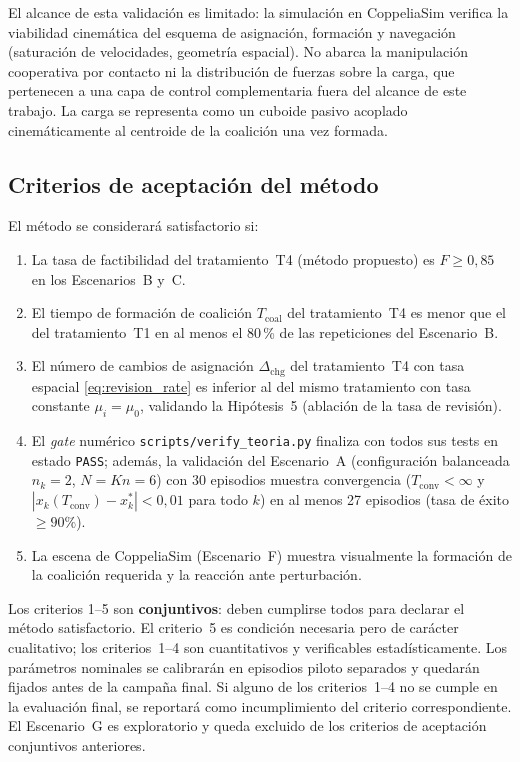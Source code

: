 El alcance de esta validación es limitado: la simulación en CoppeliaSim verifica la
viabilidad cinemática del esquema de asignación, formación y navegación (saturación de
velocidades, geometría espacial). No abarca la manipulación cooperativa por contacto ni
la distribución de fuerzas sobre la carga, que pertenecen a una capa de control
complementaria \citep{ebel2024cooperative, rosenfelder2024force} fuera del alcance de
este trabajo. La carga se representa como un cuboide pasivo acoplado cinemáticamente al
centroide de la coalición una vez formada.

\subsection{Criterios de aceptación del método}

El método se considerará satisfactorio si:

\begin{enumerate}
  \item La tasa de factibilidad del tratamiento~T4 (método propuesto) es
    $F \geq 0{,}85$ en los Escenarios~B y~C.
  \item El tiempo de formación de coalición $T_{\text{coal}}$ del tratamiento~T4
    es menor que el del tratamiento~T1 en al menos el 80\,\% de las repeticiones
    del Escenario~B.
  \item El número de cambios de asignación $\Delta_{\text{chg}}$ del
    tratamiento~T4 con tasa espacial \eqref{eq:revision_rate} es inferior al del
    mismo tratamiento con tasa constante $\mu_i = \mu_0$, validando la
    Hipótesis~5 (ablación de la tasa de revisión).
  \item El \emph{gate} numérico \texttt{scripts/verify\_teoria.py} finaliza con todos
    sus tests en estado \texttt{PASS}; además, la validación del Escenario~A
    (configuración balanceada $n_k=2$, $N=Kn=6$) con 30 episodios muestra convergencia
    ($T_{\mathrm{conv}} < \infty$ y
    $|x_k(T_{\text{conv}}) - x_k^*| < 0{,}01$ para todo $k$) en al menos 27 episodios
    (tasa de éxito ${\geq}90\%$).
  \item La escena de CoppeliaSim (Escenario~F) muestra visualmente la formación
    de la coalición requerida y la reacción ante perturbación.
\end{enumerate}

Los criterios 1--5 son \textbf{conjuntivos}: deben cumplirse todos para declarar el
método satisfactorio. El criterio~5 es condición necesaria pero de carácter
cualitativo; los criterios~1--4 son cuantitativos y verificables estadísticamente.
Los parámetros nominales se calibrarán en episodios piloto separados y quedarán fijados
antes de la campaña final. Si alguno de los criterios~1--4 no se cumple en la evaluación
final, se reportará como incumplimiento del criterio correspondiente. El Escenario~G es
exploratorio y queda excluido de los criterios de aceptación conjuntivos anteriores.


